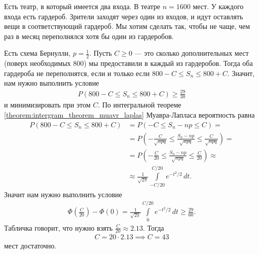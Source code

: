 \documentclass[../main.tex]{subfiles}
\begin{document}
\begin{exmpl}
 Есть театр, в который имеется два входа. В театре $n=1600$ мест. У каждого входа есть гардероб. Зрители заходят через один из входов, и идут оставлять вещи в соответствующий гардероб. Мы хотим сделать так, чтобы не чаще, чем раз в месяц переполнялся хотя бы один из гардеробов. 

 Есть схема Бернулли, $p = \frac{1}{2}$. Пусть $C \geqslant 0$ --- это сколько дополнительных мест (поверх необходимых $800$) мы предоставили в каждый из гардеробов. Тогда оба гардероба не переполнятся, если и только если $800 - C \leqslant S_n \leqslant 800 + C$. Значит, нам нужно выполнить условие
 \begin{align*}
  P(800 - C \leqslant S_n \leqslant 800 + C) \geqslant \frac{29}{30}
 \end{align*} и минимизировать при этом $C$. По интегральной теореме \ref{theorem:intergram_theorem_muavr_laplas} Муавра-Лапласа вероятность равна
 \begin{align*}
  P(800 - C \leqslant S_n \leqslant 800 + C) &= P(-C \leqslant S_n - np \leqslant C) = \\
  &= P\left(-\frac{C}{\sqrt{npq}} \leqslant \frac{S_n - np}{\sqrt{npq}} \leqslant \frac{C}{\sqrt{npq}}\right) = \\
  &= P \left( -\frac{C}{20} \leqslant \frac{S_n - np}{\sqrt{npq}} \leqslant \frac{C}{20} \right) \approx \\
  &\approx \frac{1}{\sqrt{2\pi}} \int\limits_{-C / 20}^{C / 20}  e^{-t^{2} / 2} \, dt.
 \end{align*} Значит нам нужно выполнить условие
 \begin{align*}
  \Phi\left(\frac{C}{20}\right) - \Phi(0) = \frac{1}{\sqrt{2\pi}}\int\limits_{0}^{C / 20} e^{-t^{2} / 2} \, dt \geqslant \frac{29}{60}
 .\end{align*} Табличка говорит, что нужно взять $\frac{C}{20} \approx 2.13$. Тогда
 \begin{align*}
  C = 20 \cdot 2.13 \implies C = 43 
 \end{align*} мест достаточно.
\end{exmpl}
\end{document}
